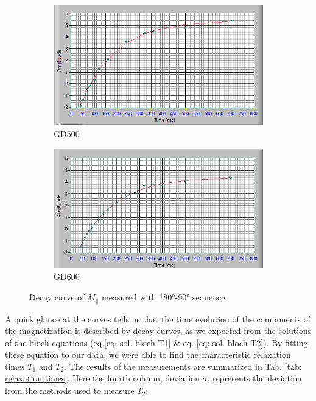 \begin{figure}[!htbp]
  \centering
  \begin{subfigure}[b]{0.45\textwidth}
    \centering
    \includegraphics[width=\textwidth]{./Protocol images/GD500_T1 (1).png}
    \caption{GD500}
    \label{fig:GD500 T1}
  \end{subfigure}
  \hfill
  \begin{subfigure}[b]{0.45\textwidth}
    \centering
    \includegraphics[width=\textwidth]{./Protocol images/GD600_T1 (1).jpg}
    \caption{GD600}
    \label{fig:GD600 T1}
  \end{subfigure}
  \caption{Decay curve of $M_\parallel$ measured with 180°-90° sequence}
  \label{fig:subsidebyside}
\end{figure}
A quick glance at the curves tells us that the time evolution of the components of the magnetization is described by decay curves, as we expected from the solutions of the bloch equations (eq.\ref{eq: sol. bloch T1} \& eq. \ref{eq: sol. bloch T2}). By fitting these equation to our data, we were able to find the characteristic relaxation times $T_1$ and $T_2$. The results of the measurements are summarized in Tab. \ref{tab: relaxation times}. Here the fourth column, deviation $\sigma$, represents the deviation from the methods used to measure $T_2$:
